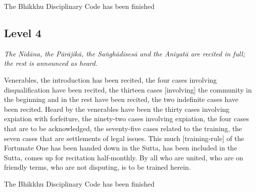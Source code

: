 \begin{outro}
	The Bhikkhu Disciplinary Code has been finished
\end{outro}

{}
\subsection*{Level 4}
\label{in-brief-english-level4}

\textit{The Nidāna, the Pārājikā, the Saṅghādisesā and the Aniyatā are recited in full; the rest is announced as heard.}

\smallskip

Venerables, the introduction has been recited, the four cases involving disqualification have been recited, the thirteen cases [involving] the community in the beginning and in the rest have been recited, the two indefinite cases have been recited. Heard by the venerables have been the thirty cases involving expiation with forfeiture, the ninety-two cases involving expiation, the four cases that are to be acknowledged, the seventy-five cases related to the training, the seven cases that are settlements of legal issues. This much [training-rule] of the Fortunate One has been handed down in the Sutta, has been included in the Sutta, comes up for recitation half-monthly. By all who are united, who are on friendly terms, who are not disputing, is to be trained herein.

\begin{outro}
	The Bhikkhu Disciplinary Code has been finished
\end{outro}

\clearpage

